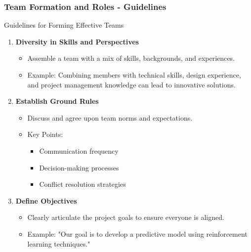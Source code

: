 \documentclass{beamer}
\begin{document}
\begin{frame}[fragile]
    \frametitle{Team Formation and Roles - Guidelines}
    \begin{block}{Guidelines for Forming Effective Teams}
        \begin{enumerate}
            \item \textbf{Diversity in Skills and Perspectives}
            \begin{itemize}
                \item Assemble a team with a mix of skills, backgrounds, and experiences.
                \item Example: Combining members with technical skills, design experience, and project management knowledge can lead to innovative solutions.
            \end{itemize}

            \item \textbf{Establish Ground Rules}
            \begin{itemize}
                \item Discuss and agree upon team norms and expectations.
                \item Key Points:
                \begin{itemize}
                    \item Communication frequency
                    \item Decision-making processes
                    \item Conflict resolution strategies
                \end{itemize}
            \end{itemize}

            \item \textbf{Define Objectives}
            \begin{itemize}
                \item Clearly articulate the project goals to ensure everyone is aligned.
                \item Example: "Our goal is to develop a predictive model using reinforcement learning techniques."
            \end{itemize}
        \end{enumerate}
    \end{block}
\end{frame}
\end{document}
